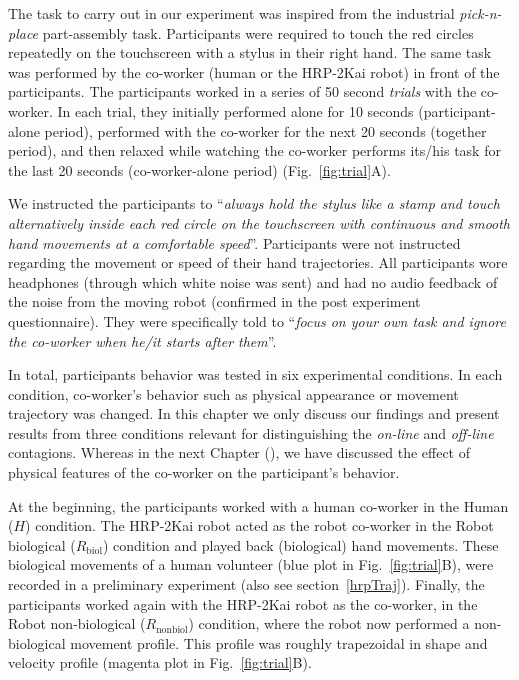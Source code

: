 The task to carry out in our experiment was inspired from the industrial \textit{pick-n-place} part-assembly task. Participants were required to touch the red circles repeatedly on the touchscreen with a stylus in their right hand. The same task was performed by the co-worker (human or the HRP-2Kai robot) in front of the participants. The participants worked in a series of 50 second \textit{trials} with the co-worker. In each trial, they initially performed alone for 10 seconds (participant-alone period), performed with the co-worker for the next 20 seconds (together period), and then relaxed while watching the co-worker performs its/his task for the last 20 seconds (co-worker-alone period) (Fig.~\ref{fig:trial}A).

We instructed the participants to ``{\it always hold the stylus like a stamp and touch alternatively inside each red circle on the touchscreen with continuous and smooth hand movements at a comfortable speed}''. Participants were not instructed regarding the movement or speed of their hand trajectories. All participants wore headphones (through which white noise was sent) and had no audio feedback of the noise from the moving robot (confirmed in the post experiment questionnaire). They were specifically told to ``{\it focus on your own task and ignore the co-worker when he/it starts after them}''.

In total, participants behavior was tested in six experimental conditions. In each condition, co-worker's behavior such as physical appearance or movement trajectory was changed. In this chapter we only discuss our findings and present results from three conditions relevant for distinguishing the \textit{on-line} and \textit{off-line} contagions. Whereas in the next Chapter (), we have discussed the effect of physical features of the co-worker on the participant's behavior. 

At the beginning, the participants worked with a human co-worker in the Human ($H$) condition. The HRP-2Kai robot acted as the robot co-worker in the Robot biological ($R_{\text{biol}}$) condition and played back (biological) hand movements. These biological movements of a human volunteer (blue plot in Fig.~\ref{fig:trial}B), were recorded in a preliminary experiment (also see section~\ref{hrpTraj}). Finally, the participants worked again with the HRP-2Kai robot as the co-worker, in the Robot non-biological ($R_{\text{nonbiol}}$) condition, where the robot now performed a non-biological movement profile. This profile was roughly trapezoidal in shape and velocity profile (magenta plot in Fig.~\ref{fig:trial}B). 

